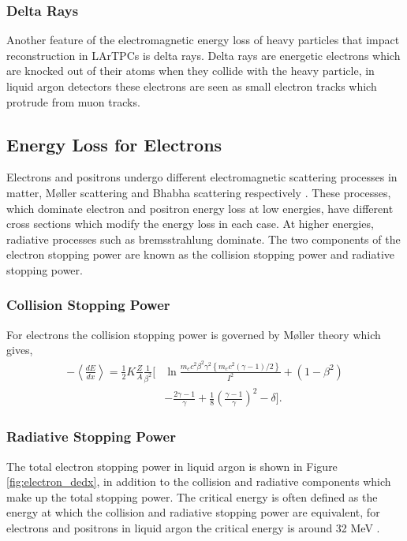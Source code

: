 \subsubsection*{Delta Rays}
Another feature of the electromagnetic energy loss of heavy particles that
impact reconstruction in LArTPCs is delta rays. Delta rays are energetic
electrons which are knocked out of their atoms when they collide with the heavy
particle, in liquid argon detectors these electrons are seen as small electron 
tracks which protrude from muon tracks. 

\subsection{Energy Loss for Electrons}
Electrons and positrons undergo different electromagnetic scattering processes
in matter, M{\o}ller scattering and Bhabha scattering respectively 
\cite{TODO}. These processes, which dominate electron and positron energy loss 
at low energies, have different cross sections which modify the energy loss in 
each case. At higher energies, radiative processes such as bremsstrahlung 
dominate. The two components of the electron stopping power are known as the 
collision stopping power and radiative stopping power.

\subsubsection*{Collision Stopping Power}
For electrons the collision stopping power is governed by M{\o}ller theory
which gives,
\begin{align}
	- \left< \frac{dE}{dx} \right> = \frac{1}{2} K \frac{Z}{A} \frac{1}{\beta^2}
	\bigg[ &\ln \frac{m_e c^2 \beta^2 \gamma^2 \left\{ m_e c^2 (\gamma - 1) / 2
	\right\} }{I^2} + (1 - \beta^2)  \\
	&- \frac{2\gamma - 1}{\gamma} + \frac{1}{8} 
	\left(\frac{\gamma - 1}{\gamma}\right)^2 - \delta \bigg]. 
\end{align}

\subsubsection*{Radiative Stopping Power}


\bigskip

The total electron stopping power in liquid argon is shown in Figure
\ref{fig:electron_dedx}, in addition to the collision and radiative components
which make up the total stopping power. The critical energy is often defined as
the energy at which the collision and radiative stopping power are equivalent,
for electrons and positrons in liquid argon the critical energy is around 32
MeV \cite{pdg_atomictables}.

